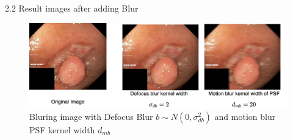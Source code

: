 \documentclass{libs/ufc_format}
\begin{document}
\begin{frame}{2.2 Result images after adding Blur}






    \begin{figure}
        \centering
        \includegraphics[width=1\textwidth]{libs/bluraddres2.png}
        \caption{Bluring image with Defocus Blur $b \sim N(0, \sigma^2_{db})$ and motion blur PSF kernel width $d_{mb}$}
        \label{blur_inpainted}
    \end{figure}
\end{frame}
\end{document}
